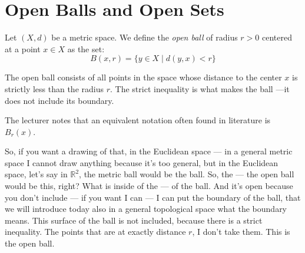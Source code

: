 \section{Open Balls and Open Sets}

\begin{math-stroke}
\setcounter{section}{2} \setcounter{subsection}{0} \setcounter{theorem}{37}
\begin{definition}\label{def:open-ball-v2}
Let $(X, d)$ be a metric space. We define the \emph{open ball} of radius $r > 0$ centered at a point $x \in X$ as the set:
\[ B(x, r) = \{ y \in X \mid d(y, x) < r \} \]
\end{definition}

\begin{explanation-of-steps}
The open ball consists of all points in the space whose distance to the center $x$ is strictly less than the radius $r$. The strict inequality is what makes the ball —it does not include its boundary.
\end{explanation-of-steps}

\begin{ai-note}[Notation]
The lecturer notes that an equivalent notation often found in literature is $B_r(x)$.
\end{ai-note}
\end{math-stroke}

\begin{spoken-clean}[00:03:54 - 00:04:51]
So, if you want a drawing of that, in the Euclidean space --- in a general metric space I cannot draw anything because it's too general, but in the Euclidean space, let's say in $\mathbb{R}^2$, the metric ball would be the ball. So, the --- the open ball would be this, right?  What is inside of the --- of the ball. And it's open because you don't include --- if you want I can --- I can put the boundary of the ball, that we will introduce today also in a general topological space what the boundary means. This surface of the ball is not included, because there is a strict inequality. The points that are at exactly distance $r$, I don't take them. This is the open ball.
\end{spoken-clean}

